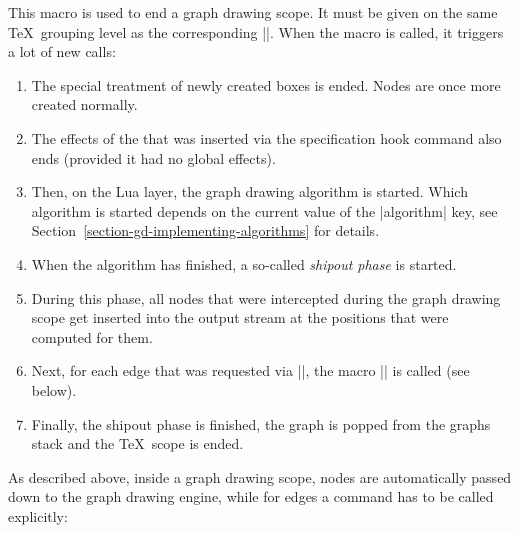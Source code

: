 \begin{command}{\pgfgdendscope}
  This macro is used to end a graph drawing scope. It must be given on
  the same \TeX\ grouping level as the corresponding
  |\pgfgdbeginscope|. When the macro is called, it triggers a lot of
  new calls:
  \begin{enumerate}
  \item The special treatment of newly created boxes is ended. Nodes
    are once more created normally.
  \item The effects of the  that was inserted via the
    specification hook command also ends (provided it had no global
    effects).
  \item Then, on the Lua layer, the graph drawing algorithm is
    started. Which algorithm is started depends on the current value
    of the |algorithm| key, see
    Section~\ref{section-gd-implementing-algorithms} for details.
  \item When the algorithm has finished, a so-called \emph{shipout
      phase} is started.
  \item During this phase, all nodes that were intercepted during the
    graph drawing scope get inserted into the output stream at the
    positions that were computed for them.
  \item Next, for each edge that was requested via |\pgfgdedge|, the
    macro |\pgfgdedgecallback| is called (see below).
  \item Finally, the shipout phase is finished, the graph is popped
    from the graphs stack and the \TeX\ scope is ended. 
  \end{enumerate}
\end{command}


As described above, inside a graph drawing scope, nodes are
automatically passed down to the graph drawing engine, while for edges
a command has to be called explicitly:

